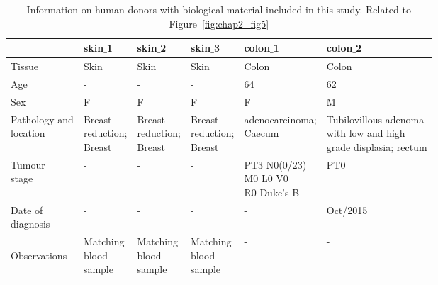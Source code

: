 \begin{table}[H]
\footnotesize
\caption{Information on human donors with biological material included in this study.  Related to Figure~\ref{fig:chap2_fig5}}
\centering
\label{table:tab_A_2}
\begin{tabular}{l|l l l l l}
\hline 
  & skin${\_}$1 & skin${\_}$2 & skin${\_}$3 & colon${\_}$1 & colon${\_}$2\\
\hline
Tissue & Skin & Skin & Skin & Colon & Colon\\

Age & - & - & - & 64 & 62\\

Sex & F & F & F & F & M\\

\specialcell[t]{Pathology and\\location} & \specialcell[t]{Breast\\reduction;\\Breast} & \specialcell[t]{Breast\\reduction;\\Breast} & \specialcell[t]{Breast\\reduction;\\Breast} & \specialcell[t]{adenocarcinoma;\\Caecum} & \specialcell[t]{Tubilovillous adenoma\\with low and high\\grade displasia; rectum}\\

\specialcell[t]{Tumour\\stage} & - & - & - & \specialcell[t]{PT3 N0(0/23)\\M0 L0 V0\\R0 Duke's B} & PT0\\

\specialcell[t]{Date of\\diagnosis} & - & - & - & - & Oct/2015\\

\specialcell[t]{ \\Observations\\ } & \specialcell[t]{Matching\\blood\\sample} & \specialcell[t]{Matching\\blood\\sample} & \specialcell[t]{Matching\\blood\\sample} & - & -\\
\hline 
\end{tabular}
\end{table}

